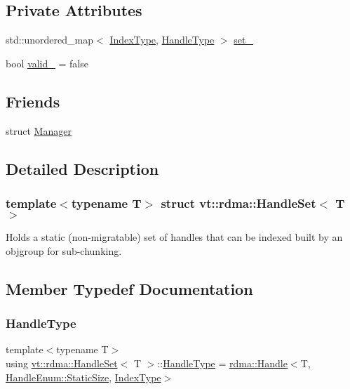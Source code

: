 \subsection*{Private Attributes}
\begin{DoxyCompactItemize}
\item 
std\+::unordered\+\_\+map$<$ \hyperlink{structvt_1_1rdma_1_1_handle_set_aa0dbb6a47c459fb4290f0ca96e573097}{Index\+Type}, \hyperlink{structvt_1_1rdma_1_1_handle_set_ab3a698ee86bae503dfa84617205b2dd9}{Handle\+Type} $>$ \hyperlink{structvt_1_1rdma_1_1_handle_set_a1864dc0d064a06915f3ceb2e6e13f875}{set\+\_\+}
\item 
bool \hyperlink{structvt_1_1rdma_1_1_handle_set_a60d4c2fb59c226743eb8d9cb79d00e7a}{valid\+\_\+} = false
\end{DoxyCompactItemize}
\subsection*{Friends}
\begin{DoxyCompactItemize}
\item 
struct \hyperlink{structvt_1_1rdma_1_1_handle_set_a1fd6b9bc3f72bb2b64e602de3982929d}{Manager}
\end{DoxyCompactItemize}


\subsection{Detailed Description}
\subsubsection*{template$<$typename T$>$\newline
struct vt\+::rdma\+::\+Handle\+Set$<$ T $>$}

Holds a static (non-\/migratable) set of handles that can be indexed built by an objgroup for sub-\/chunking. 

\subsection{Member Typedef Documentation}
\mbox{\label{structvt_1_1rdma_1_1_handle_set_ab3a698ee86bae503dfa84617205b2dd9}} 
\subsubsection{\texorpdfstring{Handle\+Type}{HandleType}}
{\footnotesize\ttfamily template$<$typename T$>$ \\
using \hyperlink{structvt_1_1rdma_1_1_handle_set}{vt\+::rdma\+::\+Handle\+Set}$<$ T $>$\+::\hyperlink{structvt_1_1rdma_1_1_handle_set_ab3a698ee86bae503dfa84617205b2dd9}{Handle\+Type} =  \hyperlink{structvt_1_1rdma_1_1_handle}{rdma\+::\+Handle}$<$T, \hyperlink{namespacevt_1_1rdma_a0234ff19cfb3c04718cfdfd36b2d6d88a0c5c41d6a0319a61d3a5e8a060b7c4d7}{Handle\+Enum\+::\+Static\+Size}, \hyperlink{structvt_1_1rdma_1_1_handle_set_aa0dbb6a47c459fb4290f0ca96e573097}{Index\+Type}$>$}

